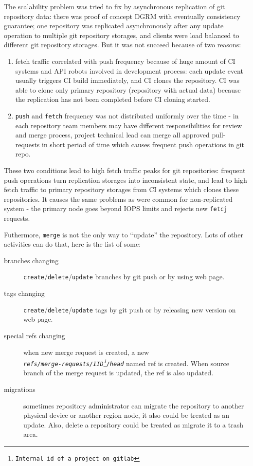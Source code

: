 \documentclass[12pt,oneside]{article}
\newcommand{\code}[1]{\texttt{#1}}
\begin{document}
The scalability problem was tried to fix by asynchronous replication of git repository data:
there was proof of concept DGRM with eventually consistency guarantee;
one repository was replicated asynchronously after any update operation to multiple git repository storages,
and clients were load balanced to different git repository storages.
But it was not succeed because of two reasons:
\begin{enumerate}
  \item fetch traffic correlated with push frequency because of huge amount of
  CI systems and API robots involved in development process: each update event usually triggers
  CI build immediately, and CI clones the repository. CI was able to clone only
  primary repository (repository with actual data) because the replication has not been completed
  before CI cloning started.
  \item \code{push} and \code{fetch} frequency was not distributed uniformly over the time - in each
  repository team members may have different responsibilities for review and merge process,
  project technical lead can merge all approved pull-requests in short period of time
  which causes frequent push operations in git repo.
\end{enumerate}

These two conditions lead to high fetch traffic peaks for git repositories:
frequent push operations turn replication storages into inconsistent state,
and lead to high fetch traffic to primary repository storages from CI systems which clones these repositories.
It causes the same problems as were common for non-replicated system - the primary node goes beyond IOPS limits and
rejects new \code{fetcj} requests.

Futhermore, \code{merge} is not the only way to ``update'' the repository. Lots of other activities can do that,
here is the list of some:

\begin{description}
  \item[branches changing] \verb|create|/\verb|delete|/\verb|update| branches by git push or by using web page.
  \item[tags changing] \verb|create|/\verb|delete|/\verb|update| tags by git push or by releasing new version on web page.
  \item[special refs changing] when new merge request is created, a new\\
    \emph{\code{refs/merge-requests/IID\footnote{Internal id of a project on gitlab}/head}} named ref
    is created. When source branch of the merge request is updated, the ref is also updated.
  \item[migrations] sometimes repository administrator can migrate the repository to
    another physical device or another region node, it also could be treated as an update.
    Also, delete a repository could be treated as migrate it to a trash area.
\end{description}
\end{document}
